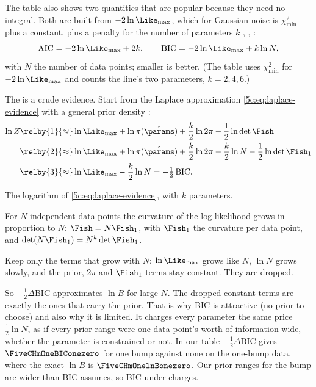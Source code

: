 The table also shows two quantities that are popular because they need no integral.
Both are built from $-2\ln\Like_{\max}$, which for Gaussian noise is $\chi^2_{\min}$ plus a
constant, plus a penalty for the number of parameters $k$ ,
\cite[\S4.7]{Trotta2008}, :
\[
  \mathrm{AIC}=-2\ln\Like_{\max}+2k,\qquad
  \mathrm{BIC}=-2\ln\Like_{\max}+k\ln N ,
\]
with $N$ the number of data points; smaller is better. (The table uses $\chi^2_{\min}$ for
$-2\ln\Like_{\max}$ and counts the line's two parameters, $k=2,4,6$.)

The  is a crude evidence. Start from the Laplace
approximation \eqref{5c:eq:laplace-evidence} with a general prior density
\cite[eqs.~(39)--(41)]{Trotta2008}:
\begin{align}
  \ln Z
  &\relby{1}{\approx}\ln\Like_{\max}+\ln\pi(\hat\params)+\frac k2\ln2\pi-\frac12\ln\det\Fish
   \nonumber\\
  &\relby{2}{\approx}\ln\Like_{\max}+\ln\pi(\hat\params)+\frac k2\ln2\pi-\frac k2\ln N-\frac12\ln\det\Fish_1
   \nonumber\\
  &\relby{3}{\approx}\ln\Like_{\max}-\frac k2\ln N=-\tfrac12\,\mathrm{BIC} .
  \label{5c:eq:bic}
\end{align}
\begin{explain}
  \item The logarithm of \eqref{5c:eq:laplace-evidence}, with $k$ parameters.
  \item For $N$ independent data points the curvature of the log-likelihood grows in
        proportion to $N$: $\Fish=N\Fish_1$, with $\Fish_1$ the curvature per data point,
        and $\det(N\Fish_1)=N^k\det\Fish_1$.
  \item Keep only the terms that grow with $N$: $\ln\Like_{\max}$ grows like $N$,
        $\ln N$ grows slowly, and the prior, $2\pi$ and $\Fish_1$ terms stay constant.
        They are dropped.
\end{explain}
So $-\tfrac12\Delta\mathrm{BIC}$ approximates $\ln B$ for large $N$. The dropped
constant terms are exactly the ones that carry the prior. That is why BIC is attractive
(no prior to choose) and also why it is limited. It charges every parameter the same
price $\tfrac12\ln N$, as if every prior range were one data point's worth of
information wide, whether the parameter is constrained or not. In our table
$-\tfrac12\Delta\mathrm{BIC}$ gives $\FiveCHmOneBIConezero$ for one bump against none on
the one-bump data, where the exact $\ln B$ is $\FiveCHmOnelnBonezero$. Our prior ranges
for the bump are wider than BIC assumes, so BIC under-charges.

